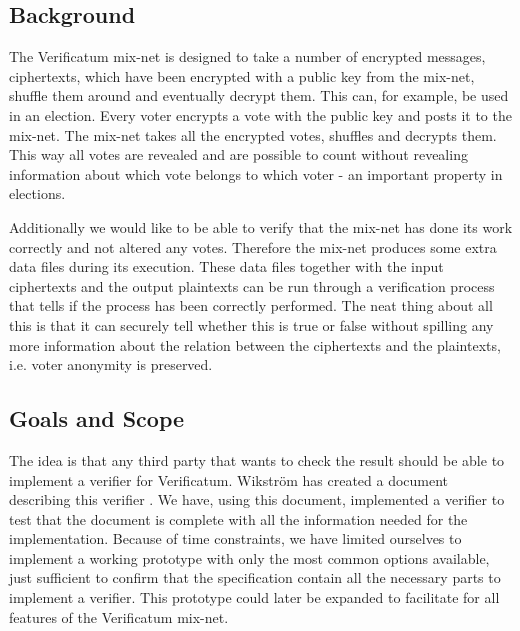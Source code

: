 \subsection{Background}

The Verificatum mix-net is designed to take a number of encrypted
messages, ciphertexts, which have been encrypted with a
public key from the mix-net, shuffle them around and eventually
decrypt them. This can, for example, be used in an election. Every voter
encrypts a vote with the public key and posts it to the mix-net. The
mix-net takes all the encrypted votes, shuffles and decrypts
them. This way all votes are revealed and are possible to count without
revealing information about which vote belongs to which voter - 
an important property in elections.

Additionally we would like to be able to verify that the mix-net has
done its work correctly and not altered any votes. Therefore the
mix-net produces some extra data files during its execution. These
data files together with the input ciphertexts and the output
plaintexts can be run through a verification process that tells if the
process has been correctly performed. The neat thing about all this is
that it can securely tell whether this is true or false without
spilling any more information about the relation between the
ciphertexts and the plaintexts, i.e. voter anonymity is preserved.

\subsection{Goals and Scope}

The idea is that any third party that wants to check the result should
be able to implement a verifier for Verificatum. Wikström has created
a document describing this verifier \cite{wikstrom1}. We have, using
this document, implemented a verifier to test that the document is
complete with all the information needed for the
implementation. Because of time constraints, we have limited ourselves
to implement a working prototype with only the most common options
available, just sufficient to confirm that the specification contain
all the necessary parts to implement a verifier. This prototype could
later be expanded to facilitate for all features of the Verificatum
mix-net.
